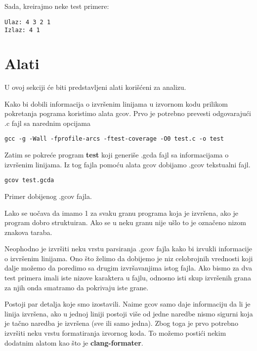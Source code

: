 \documentclass[a4paper]{article}
\begin{document}


Sada, kreirajmo neke test primere:
\begin{verbatim}
Ulaz: 4 3 2 1  
Izlaz: 4 1
\end{verbatim}

\section{Alati}
\label{sec:tools}

U ovoj sekciji će biti predstavljeni alati korišćeni za analizu.

Kako bi dobili informacija o izvršenim linijama u izvornom kodu prilikom pokretanja pograma koristimo alata gcov. Prvo je potrebno prevesti odgovarajući .c fajl sa narednim opcijama

\begin{verbatim}
gcc -g -Wall -fprofile-arcs -ftest-coverage -O0 test.c -o test
\end{verbatim}

Zatim se pokreće program \textbf{test} koji generiše .gcda fajl sa informacijama o izvršenim linijama. Iz tog fajla pomoću alata gcov dobijamo .gcov tekstualni fajl.

\begin{verbatim}
gcov test.gcda
\end{verbatim}

Primer dobijenog .gcov fajla.


Lako se uočava da imamo 1 za svaku granu programa koja je izvršena, ako je program dobro struktuiran. Ako se u neku granu nije ušlo to je označeno nizom znakova taraba. 

Neophodno je izvršiti neku vrstu parsiranja .gcov fajla kako bi izvukli informacije o izvršenim linijama. Ono što želimo da dobijemo je niz celobrojnih vrednosti koji dalje možemo da poredimo sa drugim izvršavanjima istog fajla. Ako bismo za dva test primera imali iste nizove karaktera u fajlu, odnosno isti skup izvršenih grana za njih onda smatramo da pokrivaju iste grane. 

Postoji par detalja koje smo izostavili. Naime gcov samo daje informaciju da li je linija izvršena, ako u jednoj liniji postoji više od jedne naredbe nismo sigurni koja je tačno naredba je izvršena (sve ili samo jedna). Zbog toga je prvo potrebno izvršiti neku vrstu formatiranja izvornog koda. To možemo postići nekim dodatnim alatom kao što je \textbf{clang-formater}.
\end{document}
